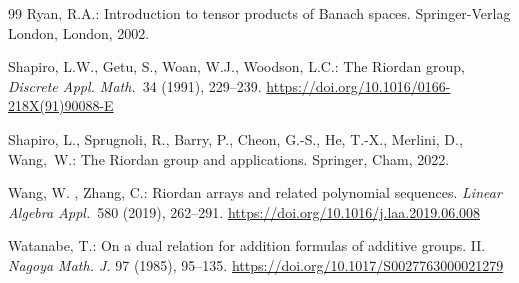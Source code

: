 \documentclass[12pt]{article}
\theoremstyle{remark}
\theoremstyle{remark}
\theoremstyle{remark}
\begin{document}
\begin{thebibliography}{99}
 Ryan, R.A.: Introduction to tensor products of Banach spaces. Springer-Verlag London,  London, 2002. 

 Shapiro, L.W.,    Getu, S., Woan, W.J.,   Woodson, L.C.: The Riordan group, {\it Discrete Appl. Math.}\ 34 (1991), 229--239.\newline
 \href{https://doi.org/10.1016/0166-218X(91)90088-E}{https://doi.org/10.1016/0166-218X(91)90088-E} 

 Shapiro, L., Sprugnoli, R., Barry, P., Cheon, G.-S., He, T.-X., Merlini, D.,  Wang,~W.: The Riordan group and applications.  Springer, Cham, 2022. 

 Wang, W. ,   Zhang, C.:  Riordan arrays and related polynomial sequences. {\it Linear Algebra Appl.}\ 580 (2019), 262--291. \href{https://doi.org/10.1016/j.laa.2019.06.008}{https://doi.org/10.1016/j.laa.2019.06.008} 
 

 Watanabe, T.: On a dual relation for addition formulas of additive groups. II. {\it Nagoya Math. J.} 97 (1985), 95--135. \href{https://doi.org/10.1017/S0027763000021279}{https://doi.org/10.1017/S0027763000021279} 

\end{thebibliography}
\end{document}
